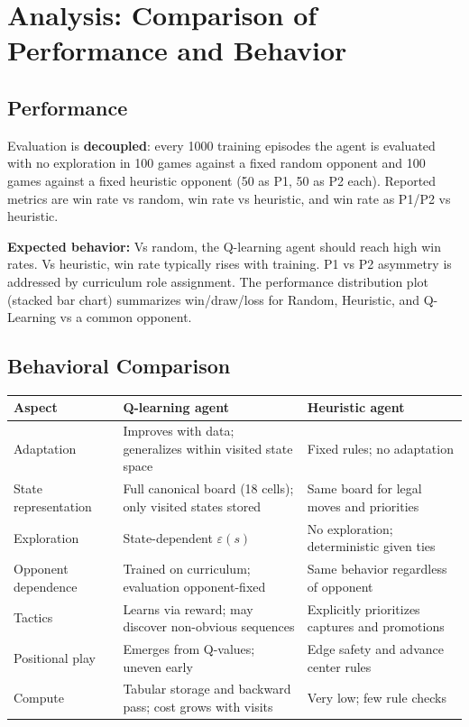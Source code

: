 \documentclass[11pt,a4paper]{article}
\begin{document}
\hrulefill

\section{Analysis: Comparison of Performance and Behavior}

\subsection{Performance}

Evaluation is \textbf{decoupled}: every 1000 training episodes the agent is evaluated with no exploration in 100 games against a fixed random opponent and 100 games against a fixed heuristic opponent (50 as P1, 50 as P2 each). Reported metrics are win rate vs random, win rate vs heuristic, and win rate as P1/P2 vs heuristic.

\textbf{Expected behavior:} Vs random, the Q-learning agent should reach high win rates. Vs heuristic, win rate typically rises with training. P1 vs P2 asymmetry is addressed by curriculum role assignment. The performance distribution plot (stacked bar chart) summarizes win/draw/loss for Random, Heuristic, and Q-Learning vs a common opponent.

\subsection{Behavioral Comparison}

\begin{center}
\begin{tabular}{@{}lll@{}}
\toprule
\textbf{Aspect} & \textbf{Q-learning agent} & \textbf{Heuristic agent} \\
\midrule
Adaptation & Improves with data; generalizes within visited state space & Fixed rules; no adaptation \\
State representation & Full canonical board (18 cells); only visited states stored & Same board for legal moves and priorities \\
Exploration & State-dependent $\varepsilon(s)$ & No exploration; deterministic given ties \\
Opponent dependence & Trained on curriculum; evaluation opponent-fixed & Same behavior regardless of opponent \\
Tactics & Learns via reward; may discover non-obvious sequences & Explicitly prioritizes captures and promotions \\
Positional play & Emerges from Q-values; uneven early & Edge safety and advance center rules \\
Compute & Tabular storage and backward pass; cost grows with visits & Very low; few rule checks \\
\bottomrule
\end{tabular}
\end{center}
\end{document}
